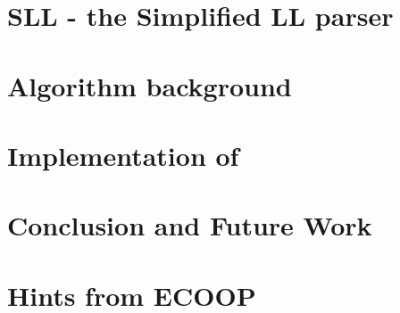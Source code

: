 \documentclass[nonatbib,preprint,numbers]{sigplanconf}
\begin{document}
\section{SLL - the Simplified LL parser}
\label{section:sll}


\section{Algorithm background}
\label{section:algorithm}


\section{Implementation of \Fajita}
\label{section:implementation}


\section{Conclusion and Future Work}
\label{section:zz}


\small


\clearpage
\appendix
\section{Hints from ECOOP}
\label{section:ecoop}

\end{document}
